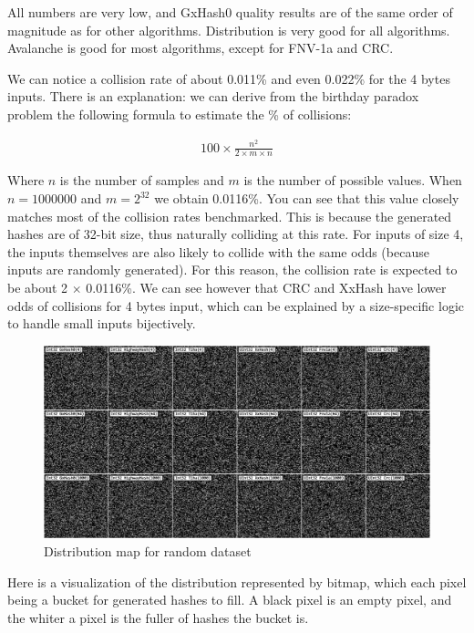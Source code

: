 \documentclass[10pt]{article}
\begin{document}
All numbers are very low, and GxHash0 quality results are of the same order of magnitude as for other algorithms. Distribution is very good for all algorithms. Avalanche is good for most algorithms, except for FNV-1a and CRC.

We can notice a collision rate of about 0.011\% and even 0.022\% for the 4 bytes inputs. There is an explanation: we can derive from the birthday paradox problem the following formula to
estimate the \% of collisions:

\begin{align*}
    100 \times \frac{n^2}{2 \times m \times n}
\end{align*}

Where \(n\) is the number of samples and \(m\) is the number of possible values. When \(n=1000000\) and \(m=2^{32}\) we obtain 0.0116\%.
You can see that this value closely matches most of the collision rates benchmarked. This is because the generated hashes are of 32-bit size,
thus naturally colliding at this rate. For inputs of size 4, the inputs themselves are also likely to collide with the same odds (because inputs are randomly generated). For this reason, the collision rate is expected to be about 2 \(\times\) 0.0116\%.
We can see however that CRC and XxHash\cite{xxhash} have lower odds of collisions for 4 bytes input, which can be explained by a size-specific logic to handle small inputs bijectively.

\begin{figure}[H]
\centering
\includegraphics[width=1\textwidth]{quality-random.png}
\caption{Distribution map for random dataset}
\label{fig:quality-random}
\end{figure}

Here is a visualization of the distribution represented by bitmap, which each pixel being a bucket for generated hashes to fill. A black pixel is an empty pixel, and the whiter a pixel is the fuller of hashes the bucket is. 
\end{document}
